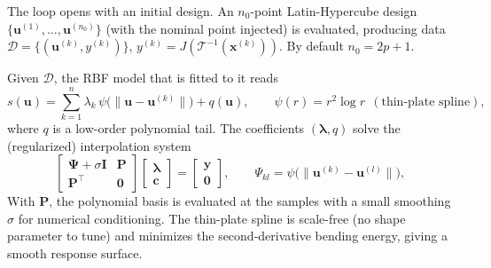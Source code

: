 \documentclass{article}
\newcommand{\xv}{\bm{x}}
\begin{document}
The loop opens with an initial design. An $n_0$-point Latin-Hypercube design
\citep{McKay1979} $\{\bm{u}^{(1)},\dots,\bm{u}^{(n_0)}\}$ (with the nominal point
injected) is evaluated, producing data $\mathcal{D}=\{(\bm{u}^{(k)},y^{(k)})\}$,
$y^{(k)}=J(\mathcal{T}^{-1}(\xv^{(k)}))$. By default $n_0=2p+1$.

Given $\mathcal{D}$, the RBF model that is fitted to it reads
\begin{equation}
  s(\bm{u})=\sum_{k=1}^{n}\lambda_k\,\psi\big(\lVert\bm{u}-\bm{u}^{(k)}\rVert\big)
  +q(\bm{u}),
  \qquad
  \psi(r)=r^{2}\log r \ \ (\text{thin-plate spline}),
  \label{eq:rbf}
\end{equation}
where $q$ is a low-order polynomial tail. The coefficients $(\bm{\lambda},q)$ solve
the (regularized) interpolation system
\begin{equation}
  \begin{bmatrix} \bm{\Psi}+\sigma\bm{I} & \bm{P}\\ \bm{P}^{\!\top} & \bm{0}\end{bmatrix}
  \begin{bmatrix}\bm{\lambda}\\ \bm{c}\end{bmatrix}
  =\begin{bmatrix}\bm{y}\\ \bm{0}\end{bmatrix},
  \qquad
  \Psi_{kl}=\psi\big(\lVert\bm{u}^{(k)}-\bm{u}^{(l)}\rVert\big),
  \label{eq:rbf-system}
\end{equation}
With $\bm{P}$, the polynomial basis is evaluated at the samples with a small smoothing
$\sigma$ for numerical conditioning. The thin-plate spline is scale-free (no shape
parameter to tune) and minimizes the second-derivative bending energy, giving a
smooth response surface.
\end{document}
